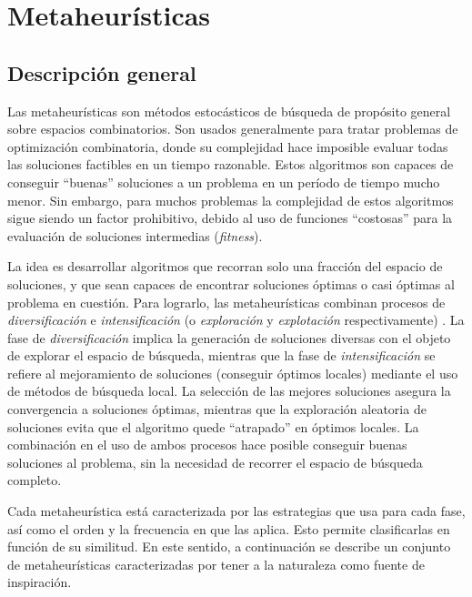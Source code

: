 \chapter{Metaheurísticas}
\label{capitulo2}

\section{Descripción general}

Las metaheurísticas son métodos estocásticos de búsqueda de propósito general sobre espacios combinatorios. Son usados generalmente para tratar problemas de optimización combinatoria, donde su complejidad hace imposible evaluar todas las soluciones factibles en un tiempo razonable. Estos algoritmos son capaces de conseguir ``buenas'' soluciones a un problema en un período de tiempo mucho menor. Sin embargo, para muchos problemas la complejidad de estos algoritmos sigue siendo un factor prohibitivo, debido al uso de funciones ``costosas'' para la evaluación de soluciones intermedias (\emph{fitness}).

La idea es desarrollar algoritmos que recorran solo una fracción del espacio de soluciones, y que sean capaces de encontrar soluciones óptimas o casi óptimas al problema en cuestión. Para lograrlo, las metaheurísticas combinan procesos de \emph{diversificación} e \emph{intensificación} (o \emph{exploración} y \emph{explotación} respectivamente) \cite{Yang:2008:NMA:1628847}. La fase de \emph{diversificación} implica la generación de soluciones diversas con el objeto de explorar el espacio de búsqueda, mientras que la fase de \emph{intensificación} se refiere al mejoramiento de soluciones (conseguir óptimos locales) mediante el uso de métodos de búsqueda local. La selección de las mejores soluciones asegura la convergencia a soluciones óptimas, mientras que la exploración aleatoria de soluciones evita que el algoritmo quede ``atrapado'' en óptimos locales. La combinación en el uso de ambos procesos hace posible conseguir buenas soluciones al problema, sin la necesidad de recorrer el espacio de búsqueda completo.

Cada metaheurística está caracterizada por las estrategias que usa para cada fase, así como el orden y la frecuencia en que las aplica. Esto permite clasificarlas en función de su similitud. En este sentido, a continuación se describe un conjunto de metaheurísticas caracterizadas por tener a la naturaleza como fuente de inspiración.

